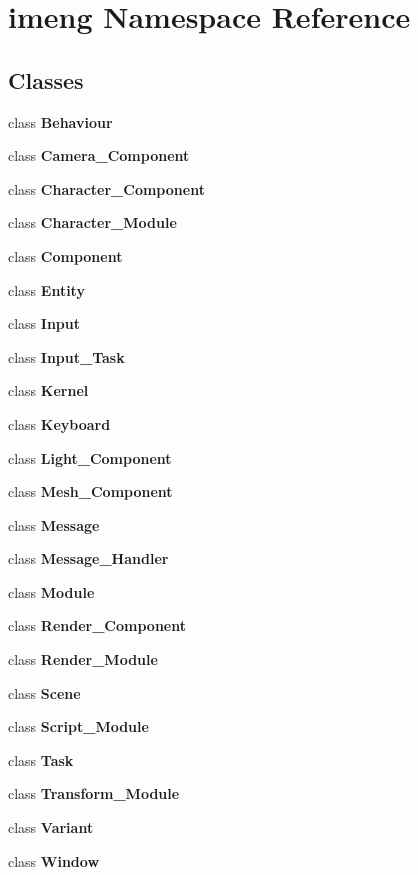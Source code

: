 \section{imeng Namespace Reference}
\label{namespaceimeng}
\subsection*{Classes}
\begin{DoxyCompactItemize}
\item 
class \textbf{ Behaviour}
\item 
class \textbf{ Camera\+\_\+\+Component}
\item 
class \textbf{ Character\+\_\+\+Component}
\item 
class \textbf{ Character\+\_\+\+Module}
\item 
class \textbf{ Component}
\item 
class \textbf{ Entity}
\item 
class \textbf{ Input}
\item 
class \textbf{ Input\+\_\+\+Task}
\item 
class \textbf{ Kernel}
\item 
class \textbf{ Keyboard}
\item 
class \textbf{ Light\+\_\+\+Component}
\item 
class \textbf{ Mesh\+\_\+\+Component}
\item 
class \textbf{ Message}
\item 
class \textbf{ Message\+\_\+\+Handler}
\item 
class \textbf{ Module}
\item 
class \textbf{ Render\+\_\+\+Component}
\item 
class \textbf{ Render\+\_\+\+Module}
\item 
class \textbf{ Scene}
\item 
class \textbf{ Script\+\_\+\+Module}
\item 
class \textbf{ Task}
\item 
class \textbf{ Transform\+\_\+\+Module}
\item 
class \textbf{ Variant}
\item 
class \textbf{ Window}
\end{DoxyCompactItemize}
